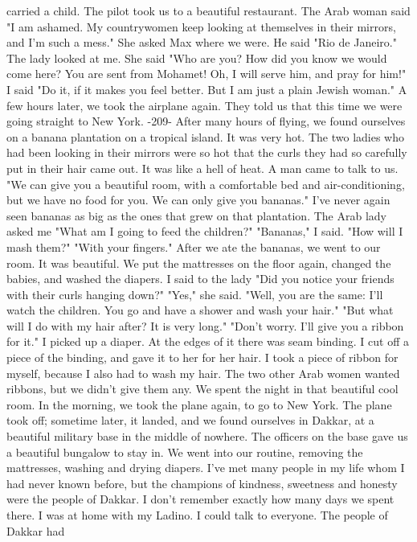 carried a child. The pilot took us to a beautiful restaurant. The 
Arab woman said "I am ashamed. My countrywomen keep looking at themselves 
in their mirrors, and I'm such a mess." 
She asked Max where we were. He said "Rio de Janeiro." The lady 
looked at me. She said "Who are you? How did you know we would come 
here? You are sent from Mohamet! Oh, I will serve him, and pray for 
him!" 
I said "Do it, if it makes you feel better. But I am just a plain 
Jewish woman." 
A few hours later, we took the airplane again. They told us that 
this time we were going straight to New York. 
-209- 
After many hours of flying, we found ourselves on a banana plantation on 
a tropical island. It was very hot. The two ladies who had been looking 
in their mirrors were so hot that the curls they had so carefully put in 
their hair came out. It was like a hell of heat. A man came to talk to 
us. 
"We can give you a beautiful room, with a comfortable bed and air-conditioning, 
but we have no food for you. We can only give you bananas." 
I've never again seen bananas as big as the ones that grew on that plantation. 
The Arab lady asked me "What am I going to feed the children?" 
"Bananas," I said. 
"How will I mash them?" 
"With your fingers." 
After we ate the bananas, we went to our room. It was beautiful. 
We put the mattresses on the floor again, changed the babies, and washed 
the diapers. I said to the lady "Did you notice your friends with their 
curls hanging down?" 
"Yes," she said. 
"Well, you are the same: I'll watch the children. You go and have 
a shower and wash your hair." 
"But what will I do with my hair after? It is very long." 
"Don't worry. I'll give you a ribbon for it." 
I picked up a diaper. At the edges of it there was seam binding. I 
cut off a piece of the binding, and gave it to her for her hair. I took 
a piece of ribbon for myself, because I also had to wash my hair. The 
two other Arab women wanted ribbons, but we didn't give them any. 
We spent the night in that beautiful cool room. In the morning, we 
took the plane again, to go to New York. The plane took off; sometime 
later, it landed, and we found ourselves in Dakkar, at a beautiful military 
base in the middle of nowhere. The officers on the base gave us a 
beautiful bungalow to stay in. We went into our routine, removing the 
mattresses, washing and drying diapers. 
I've met many people in my life whom I had never known before, but 
the champions of kindness, sweetness and honesty were the people of 
Dakkar. I don't remember exactly how many days we spent there. I was at 
home with my Ladino. I could talk to everyone. The people of Dakkar had 

